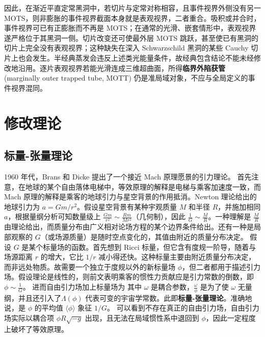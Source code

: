 因此，在渐近平直定常黑洞中，若切片与定常对称相容，且事件视界外侧没有另一 MOTS，则非膨胀的事件视界截面本身就是表观视界，二者重合。吸积或并合时，事件视界可已有正膨胀而不再是 MOTS；在通常的光滑、嵌套情形中，表观视界遂严格位于其黑洞一侧。切片改变还可使最外层 MOTS 跳跃，甚至使已有黑洞的切片上完全没有表观视界；这种缺失在深入 Schwarzschild 黑洞的某些 Cauchy 切片上也会发生。半经典蒸发会违反上述类光能量条件，故经典包含结论不能未经修改地沿用。逐片表观视界若能光滑连成三维超曲面，所得\textbf{临界外陷获管}(marginally outer trapped tube, MOTT) 仍是准局域对象，不应与全局定义的事件视界混同。

\section{修改理论}

\subsection{标量-张量理论}\label{sec:scalar}

1960 年代，Brans 和 Dicke\cite{Brans-Dicke} 提出了一个接近 Mach 原理愿景的引力理论。
首先注意，在地球的某个自由落体电梯中，等效原理的解释是电梯与乘客加速度一致，而 Mach 原理的解释是乘客的地球引力与星空背景的作用抵消。Newton 理论给出的地球引力为 $a=Gm/r^2$。假设星空背景有某种宇观质量 $M$ 和半径 $R$，并施加相同 $a$，根据量纲分析可知数量级上 $\frac{Gm}{r^2}\sim \frac{Rm}{Mr^2}$（几何制），因此 $\frac{1}{G}\sim\frac{M}{R}$。一种理解是 $\frac{M}{R}$ 由理论给出，而质量分布由广义相对论场方程的某个边界条件给出。还有一种是局部观察的 $G$（或场源质量）是随时空点变化的，其值由附近的质量分布决定。
假设 $G$ 是某个标量场的函数。首先想到 Ricci 标量，但它含有度规一阶导，随着与场源距离 $r$ 的增大，它比 $1/r$ 减小得还快。这种标量主要由附近质量分布决定，而非远处物质。故需要一个独立于度规以外的新标量场 $\phi$，但二者都用于描述引力场。假设理论是线性的，则前文表明乘客的惯性力贡献应是引力常数的倒数，即 $\phi\sim\frac{1}{G}$。
进而自由引力场加上标量场为
其中 $\omega$ 是耦合参数，$\frac{\omega}{\phi}$ 是为了使 $\omega$ 无量纲，并且还引入了$\Lambda(\phi)$ 代表可变的宇宙学常数。此即\textbf{标量-张量理论}。准确地说，是
$\phi$ 的平均值 $\langle\phi\rangle$ 象征 $1/G$。
可以看到不存在真正的自由引力场，自由引力场实际以耦合项 $\phi R\sqrt{-g}$ 出现，且无法在局域惯性系中退回到 $\phi$，因此一定程度上破坏了等效原理。


